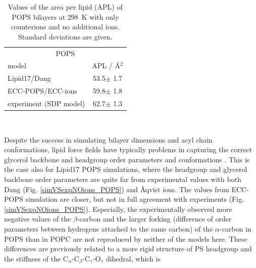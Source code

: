 \documentclass[journal=jpcbfk,manuscript=article]{achemso}
\begin{document}
\begin{table}[tb!] 
\centering
  \caption{Values of the area per lipid (APL) of POPS bilayers 
	   at 298~K with only  counterions and no additional ions. 
           Standard deviations are given. \label{tab:apls} } 
  \begin{tabular}{l|c } 
    \multicolumn{2}{c}{POPS} \\
    model          & APL / Å$^2$    \\ 
    \hline 
    Lipid17/Dang              & 53.5$\pm$ 1.7   \\ 
    ECC-POPS/ECC-ions         & 59.8$\pm$ 1.8   \\ 
    experiment (SDP model) \citep{kucerka14} & 62.7$\pm$ 1.3  \\ 
  \end{tabular} \\
\end{table} 

Despite the success in simulating bilayer dimensions and acyl chain conformations,
lipid force fields have typically problems in capturing the correct glycerol backbone and
headgroup order parameters and conformations \cite{botan15,ollila16,nmrlipids_proj4}.
This is the case also for Lipid17 POPS simulations, where the headgroup and glycerol backbone
order parameters are quite far from experimental values with both Dang (Fig. \ref{simVSexpNOions_POPS})
and {\AA}qvist \cite{nmrlipids_proj4} ions. The values from ECC-POPS simulation are closer,
but not in full agreement with experiments (Fig. \ref{simVSexpNOions_POPS}).
Especially, the experimentally observed more negative values of the $\beta$-carbon
and the larger forking (difference of order parameters between hydrogens attached to the
same carbon) of the $\alpha$-carbon in POPS than in POPC \cite{nmrlipids_proj4}
are not reproduced by neither of the models here. These differences are previously related
to a more rigid structure of PS headgroup and the stiffness of the C$_\alpha$-C$_\beta$-C$_\gamma$-O$_\gamma$
dihedral, which is 
\end{document}
